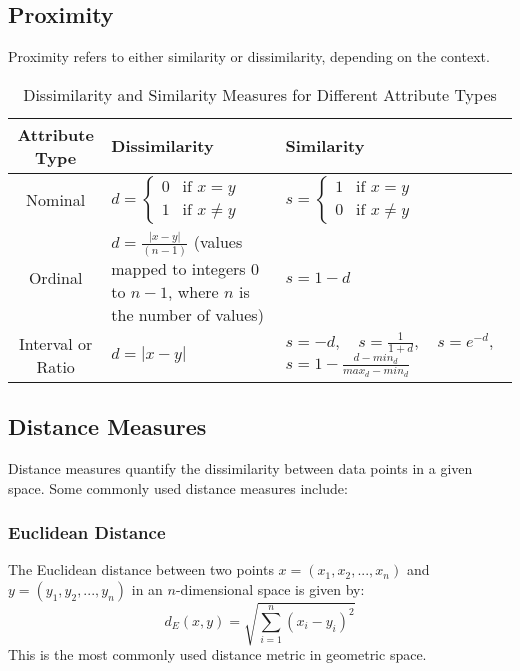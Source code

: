 \documentclass[a4paper,12pt]{article}
\begin{document}
\subsection{Proximity}
Proximity refers to either similarity or dissimilarity, depending on the context.


\begin{table}[h]
    \centering
    \renewcommand{\arraystretch}{1.5}
    \begin{tabular}{|c|p{6cm}|p{6cm}|}
        \hline
        \textbf{Attribute Type} & \textbf{Dissimilarity} & \textbf{Similarity} \\
        \hline
        Nominal & 
        $ d = \begin{cases} 
            0 & \text{if } x = y \\ 
            1 & \text{if } x \neq y 
        \end{cases} $ & 
        $ s = \begin{cases} 
            1 & \text{if } x = y \\ 
            0 & \text{if } x \neq y 
        \end{cases} $ \\
        \hline
        Ordinal & 
        $ d = \frac{|x - y|}{(n - 1)} $ \newline
        (values mapped to integers 0 to $n-1$, where $n$ is the number of values) & 
        $ s = 1 - d $ \\
        \hline
        Interval or Ratio & 
        $ d = |x - y| $ & 
        $ s = -d, \quad s = \frac{1}{1 + d}, \quad s = e^{-d}, $ \newline
        $ s = 1 - \frac{d - min_d}{max_d - min_d} $ \\
        \hline
    \end{tabular}
    \caption{Dissimilarity and Similarity Measures for Different Attribute Types}
    \label{tab:similarity_dissimilarity}
\end{table}

\subsection{Distance Measures}

Distance measures quantify the dissimilarity between data points in a given space. Some commonly used distance measures include:

\subsubsection{Euclidean Distance}
The Euclidean distance between two points \( x = (x_1, x_2, ..., x_n) \) and \( y = (y_1, y_2, ..., y_n) \) in an \( n \)-dimensional space is given by:
\begin{equation}
d_E(x, y) = \sqrt{\sum_{i=1}^{n} (x_i - y_i)^2}
\end{equation}
This is the most commonly used distance metric in geometric space.
\end{document}
